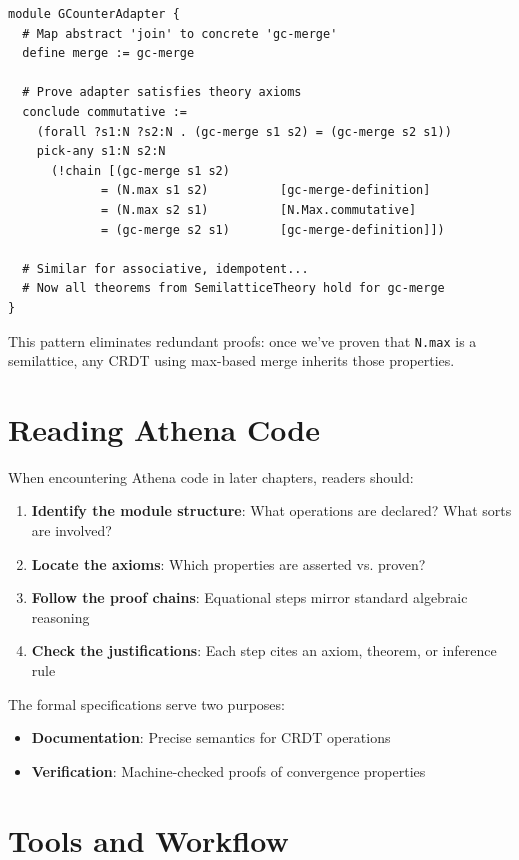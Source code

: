 \begin{lstlisting}[language=Athena,style=athena,caption={CRDT adapter inheriting semilattice properties}]
module GCounterAdapter {
  # Map abstract 'join' to concrete 'gc-merge'
  define merge := gc-merge
  
  # Prove adapter satisfies theory axioms
  conclude commutative := 
    (forall ?s1:N ?s2:N . (gc-merge s1 s2) = (gc-merge s2 s1))
    pick-any s1:N s2:N
      (!chain [(gc-merge s1 s2)
             = (N.max s1 s2)          [gc-merge-definition]
             = (N.max s2 s1)          [N.Max.commutative]
             = (gc-merge s2 s1)       [gc-merge-definition]])
  
  # Similar for associative, idempotent...
  # Now all theorems from SemilatticeTheory hold for gc-merge
}
\end{lstlisting}

This pattern eliminates redundant proofs: once we've proven that \lstinline{N.max} is a semilattice, any CRDT using max-based merge inherits those properties.

\section{Reading Athena Code}

When encountering Athena code in later chapters, readers should:

\begin{enumerate}
  \item \textbf{Identify the module structure}: What operations are declared? What sorts are involved?
  \item \textbf{Locate the axioms}: Which properties are asserted vs. proven?
  \item \textbf{Follow the proof chains}: Equational steps mirror standard algebraic reasoning
  \item \textbf{Check the justifications}: Each step cites an axiom, theorem, or inference rule
\end{enumerate}

The formal specifications serve two purposes:
\begin{itemize}
  \item \textbf{Documentation}: Precise semantics for CRDT operations
  \item \textbf{Verification}: Machine-checked proofs of convergence properties
\end{itemize}

\section{Tools and Workflow}

